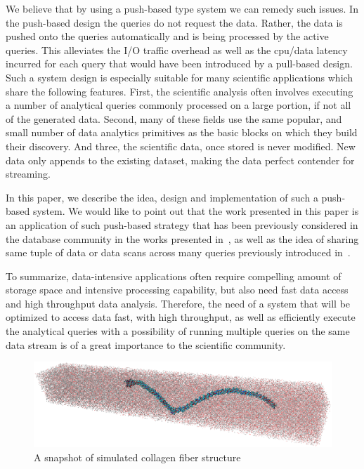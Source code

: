 \documentclass[10pt,journal,final,letterpaper,twocolumn]{IEEEtran}
\begin{document}
We believe that by using a push-based type system we can remedy such
issues. In the push-based design the queries do not request the
data. Rather, the data is pushed onto the queries automatically and
is being processed by the active queries. This alleviates the I/O
traffic overhead as well as the cpu/data latency incurred for each
query that would have been introduced by a pull-based design. Such a
system design is especially suitable for many scientific
applications which share the following features. First, the
scientific analysis often involves executing a number of analytical
queries commonly processed on a large portion, if not all of the
generated data. Second, many of these fields use the same popular,
and small number of data analytics primitives as the basic blocks on
which they build their discovery. And three, the scientific data,
once stored is never modified. New data only appends to the existing
dataset, making the data perfect contender for streaming.

In this paper, we describe the idea, design and implementation of
such a push-based system. We would like to point out that the work
presented in this paper is an application of such push-based
strategy that has been previously considered in the database
community in the works presented in~\cite{DataPath,Volcano,Qpipe},
as well as the idea of sharing same tuple of data or data scans
across many queries previously introduced
in~\cite{Candea,PredictablePerformance,CooperativeScans}.

To summarize, data-intensive applications often require compelling
amount of storage space and intensive processing capability, but
also need fast data access and high throughput data analysis.
Therefore, the need of a system that will be optimized to access
data fast, with high throughput, as well as efficiently execute the
analytical queries with a possibility of running multiple queries on
the same data stream is of a great importance to the scientific
community.

\begin{figure}
 \centerline{ \includegraphics[width=1\columnwidth]{images/snap-white.eps} }
 \caption{A snapshot of simulated collagen fiber structure}
 \label{fg:snap-white}
\end{figure}
\end{document}
